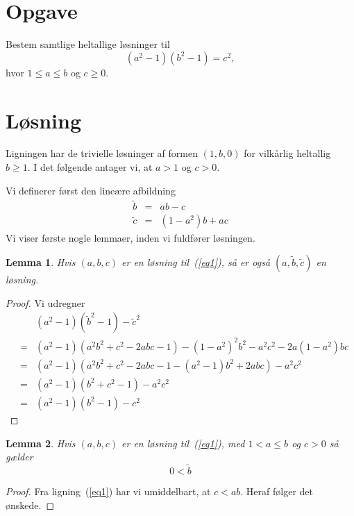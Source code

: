 \documentclass[12pt,oneside,a4paper]{article}
\newcommand{\bas}{\begin{eqnarray*}}
\newcommand{\eas}{\end{eqnarray*}}
\newcommand{\be}{\begin{equation}}
\newcommand{\ee}{\end{equation}}
\newtheorem{lem}{Lemma}[section]
\begin{document}
\section*{Opgave}
Bestem samtlige heltallige løsninger til
\be
(a^2-1)(b^2-1) = c^2,
\label{eq1}
\ee
hvor $1\le a\le b$ og $c\ge 0$.

\section*{Løsning}
Ligningen har de trivielle løsninger af formen $(1, b, 0)$ for vilkårlig
heltallig $b\ge 1$. I det følgende antager vi, at $a>1$ og $c>0$.

Vi definerer først den lineære afbildning
\bas
\tilde b &=& ab-c \\
\tilde c &=& (1-a^2)b+ac
\eas
Vi viser første nogle lemmaer, inden vi fuldfører løsningen.

\begin{lem}
    Hvis $(a,b,c)$ er en løsning til~(\ref{eq1}), så er også $(a,\tilde b,
    \tilde c)$ en løsning.
\end{lem}
\begin{proof}
    Vi udregner
    \bas
    && (a^2-1)({\tilde b}^2-1) - {\tilde c}^2 \\
    &=& (a^2-1)\left(a^2b^2 + c^2 - 2abc - 1\right) - (1-a^2)^2b^2-a^2c^2-2a(1-a^2)bc \\
    &=& (a^2-1)\left(a^2b^2 + c^2 - 2abc - 1 - (a^2-1)b^2 + 2abc\right) - a^2c^2 \\
    &=& (a^2-1)(b^2 + c^2 - 1) - a^2c^2 \\
    &=& (a^2-1)(b^2-1) - c^2
    \eas
\end{proof}

\begin{lem}
    Hvis $(a,b,c)$ er en løsning til~(\ref{eq1}), med $1<a\le b$ og $c>0$
    så gælder
    $$
    0 < \tilde b
    $$
\end{lem}
\begin{proof}
    Fra ligning~(\ref{eq1}) har vi umiddelbart, at $c<ab$. Heraf følger det ønskede.
\end{proof}
\end{document}
